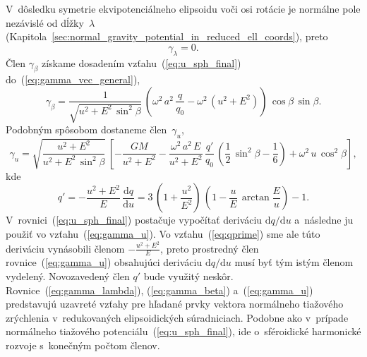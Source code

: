 \documentclass[a4paper, 12pt]{book}
\newcommand{\diff}{\mathrm d}
\begin{document}
V~dôsledku symetrie ekvipotenciálneho elipsoidu voči osi rotácie je normálne 
pole nezávislé od dĺžky~$\lambda$ 
(Kapitola~\ref{sec:normal_gravity_potential_in_reduced_ell_coords}), preto
%
\begin{equation}
\label{eq:gamma_lambda}
\gamma_\lambda = 0{.}
\end{equation}
%
Člen $\gamma_\beta$ získame dosadením vzťahu~(\ref{eq:u_sph_final}) 
do~(\ref{eq:gamma_vec_general}),
%
\begin{equation}
\label{eq:gamma_beta}
\gamma_\beta = \frac{1}{\sqrt{u^2 + E^2 \, \sin^2\beta}} \, \left( \omega^2 \, 
a^2 \, \frac{q}{q_0} - \omega^2 \, (u^2 + E^2) \right) \, \cos\beta \, 
\sin\beta{.}
\end{equation}
%
Podobným spôsobom dostaneme člen~$\gamma_u$,
%
\begin{equation}
\label{eq:gamma_u}
\gamma_u = \sqrt{\dfrac{u^2 + E^2}{u^2 + E^2 \, \sin^2\beta}} \, \left[ 
-\frac{GM}{u^2 + E^2} - \frac{\omega^2 \, a^2 \, E}{u^2 + E^2} \, 
\frac{q'}{q_0} \, \left( \frac{1}{2} \, \sin^2\beta - \frac{1}{6} \right) 
+ \omega^2 \, u \, \cos^2\beta \right]{,}
\end{equation}
%
kde \parencite{MoritzPhysicalGeodesy}
%
\begin{equation}
\label{eq:qprime}
q' = -\frac{u^2 + E^2}{E} \, \frac{\diff q}{\diff u} = 3 \, \left( 
1 + \frac{u^2}{E^2} \right) \, \left(  1 - \frac{u}{E} \, \arctan\frac{E}{u} 
\right) - 1{.}
\end{equation}
%
V~rovnici~(\ref{eq:u_sph_final}) postačuje vypočítať deriváciu $\diff q \slash 
\diff u$ a~následne ju použiť vo vzťahu~(\ref{eq:gamma_u}).  Vo 
vzťahu~(\ref{eq:qprime}) sme ale túto deriváciu vynásobili členom $-\frac{u^2 
+ E^2}{E}$, preto prostredný člen rovnice~(\ref{eq:gamma_u}) obsahujúci 
deriváciu $\diff q \slash \diff u$ musí byť tým istým členom vydelený.  
Novozavedený člen $q'$ bude využitý neskôr.  Rovnice~(\ref{eq:gamma_lambda}), 
(\ref{eq:gamma_beta}) a~(\ref{eq:gamma_u}) predstavujú uzavreté vzťahy pre 
hľadané prvky vektora normálneho tiažového zrýchlenia v~redukovaných 
elipsoidických súradniciach.  Podobne ako v~prípade normálneho tiažového 
potenciálu~(\ref{eq:u_sph_final}), ide o~sféroidické harmonické rozvoje 
s~konečným počtom členov.
\end{document}
